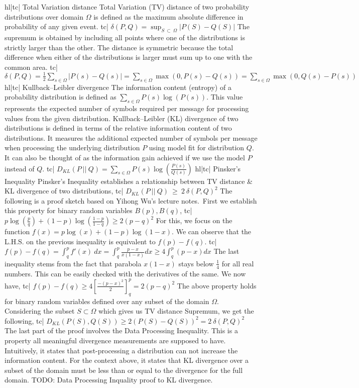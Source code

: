 hl|tc| Total Variation distance
Total Variation (TV) distance of two probability distributions over domain \(\Omega\) is defined as the maximum absolute difference in probability of any given event.
tc| \( \delta(P, Q) = \sup_{S \ \subset \ \Omega} | P(S) - Q(S) | \)
The supremum is obtained by including all points where one of the distributions is strictly larger than the other. The distance is symmetric because the total difference when either of the distributions is larger must sum up to one with the common area.
tc| \( \delta(P, Q) = \frac{1}{2} \sum_{s \in \Omega} |P(s) - Q(s)| = \sum_{s \in \Omega} \max(0, P(s) - Q(s)) = \sum_{s \in \Omega} \max(0, Q(s) - P(s)) \)
hl|tc| Kullback–Leibler divergence
The information content (entropy) of a probability distribution is defined as \( \sum_{s \in \Omega} P(s) \log(P(s)) \). This value represents the expected number of symbols required per message for processing values from the given distribution.
Kullback–Leibler (KL) divergence of two distributions is defined in terms of the relative information content of two distributions. It measures the additional expected number of symbols per message when processing the underlying distribution \(P\) using model fit for distribution \(Q\). It can also be thought of as the information gain achieved if we use the model \(P\) instead of \(Q\).
tc| \( D_{KL} (P \ || \ Q) = \sum_{s \in \Omega} P(s) \log \left(\frac{P(s)}{Q(s)}\right) \)
hl|tc| Pinsker's Inequality
Pinsker's Inequality establishes a relationship between TV distance & KL divergence of two distributions,
tc| \( D_{KL} (P \ || \ Q) \ \ge \ 2 \ \delta(P, Q)^2 \)
The following is a proof sketch based on Yihong Wu's lecture notes. First we establish this property for binary random variables \( B(p), B(q) \),
tc| \( p \log{ \left( \frac{p}{q} \right) } + (1-p) \log{ \left( \frac{1-p}{1-q} \right) \ge 2(p-q)^2 } \)
For this, we focus on the function \( f(x) = p \log (x) + (1 - p) \log (1 - x) \). We can observe that the L.H.S. on the previous inequality is equivalent to \( f(p) - f(q) \).
tc| \( f(p) - f(q) = \int_q^p f'(x) \ dx = \int_q^p \frac{p - x}{x (1 - x)} dx \ge 4 \int_q^p (p - x) dx \)
The last inequality stems from the fact that parabola \( x (1-x) \) stays below \( \frac{1}{4} \) for all real numbers. This can be easily checked with the derivatives of the same. We now have,
tc| \( f(p) - f(q) \ge 4 \left[ \frac{-(p-x)^2}{2} \right]_q^p = 2 (p - q)^2 \)
The above property holds for binary random variables defined over any subset of the domain \( \Omega \). Considering the subset \( S \subset \Omega \) which gives us TV distance Supremum, we get the following,
tc| \( D_{KL}(P(S), Q(S)) \ge  2(P(S)-Q(S))^2 = 2 \ \delta(P,Q)^2 \)
The last part of the proof involves the Data Processing Inequality. This is a property all meaningful divergence measurements are supposed to have. Intuitively, it states that post-processing a distribution can not increase the information content. For the context above, it states that KL divergence over a subset of the domain must be less than or equal to the divergence for the full domain.
TODO: Data Processing Inquality proof to KL divergence.